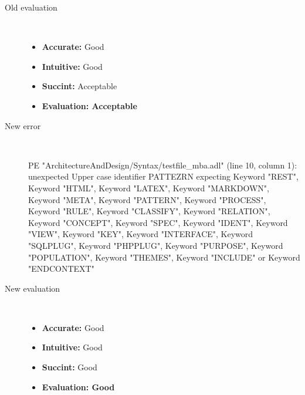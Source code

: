 \begin{description}
\begin{haskell}
\end{haskell}
  \item[Old evaluation]~\\
    \begin{itemize}
    \item \textbf{Accurate:} Good
    \item \textbf{Intuitive:} Good
    \item \textbf{Succint:} Acceptable
    \item \textbf{Evaluation: Acceptable}
    \end{itemize}
  \item[New error]~\\
\begin{haskell}
PE "ArchitectureAndDesign/Syntax/testfile_mba.adl" (line 10, column 1):
unexpected Upper case identifier PATTEZRN
expecting Keyword "REST", Keyword "HTML", Keyword "LATEX", Keyword "MARKDOWN", Keyword "META", Keyword "PATTERN", Keyword "PROCESS", Keyword "RULE", Keyword "CLASSIFY", Keyword "RELATION", Keyword "CONCEPT", Keyword "SPEC", Keyword "IDENT", Keyword "VIEW", Keyword "KEY", Keyword "INTERFACE", Keyword "SQLPLUG", Keyword "PHPPLUG", Keyword "PURPOSE", Keyword "POPULATION", Keyword "THEMES", Keyword "INCLUDE" or Keyword "ENDCONTEXT"
\end{haskell}
  \item[New evaluation]~\\
    \begin{itemize}
    \item \textbf{Accurate:} Good
    \item \textbf{Intuitive:} Good
    \item \textbf{Succint:} Good
    \item \textbf{Evaluation: Good
}
    \end{itemize}
  \end{description}

\hrulefill

